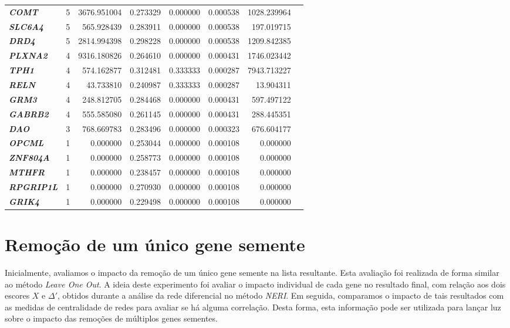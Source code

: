 \begin{table}[]
\begin{tabular}{@{}lrrrrrrr@{}}
\textbf{\textsl{COMT}}  &   5 &    3676.951004 & 0.273329 & 0.000000 & 0.000538 & 1028.239964 \\
\textbf{\textsl{SLC6A4}}  &   5 &     565.928439 & 0.283911 & 0.000000 & 0.000538 &  197.019715 \\
\textbf{\textsl{DRD4}}  &   5 &    2814.994398 & 0.298228 & 0.000000 & 0.000538 & 1209.842385 \\
\textbf{\textsl{PLXNA2}}  &   4 &    9316.180826 & 0.264610 & 0.000000 & 0.000431 & 1746.023442 \\
\textbf{\textsl{TPH1}}  &   4 &     574.162877 & 0.312481 & 0.333333 & 0.000287 & 7943.713227 \\
\textbf{\textsl{RELN}}  &   4 &      43.733810 & 0.240987 & 0.333333 & 0.000287 &   13.904311 \\
\textbf{\textsl{GRM3}}  &   4 &     248.812705 & 0.284468 & 0.000000 & 0.000431 &  597.497122 \\
\textbf{\textsl{GABRB2}}  &   4 &     555.585080 & 0.261145 & 0.000000 & 0.000431 &  288.445351 \\
\textbf{\textsl{DAO}}  &   3 &     768.669783 & 0.283496 & 0.000000 & 0.000323 &  676.604177 \\
\textbf{\textsl{OPCML}}  &   1 &       0.000000 & 0.253044 & 0.000000 & 0.000108 &    0.000000 \\
\textbf{\textsl{ZNF804A}}  &   1 &       0.000000 & 0.258773 & 0.000000 & 0.000108 &    0.000000 \\
\textbf{\textsl{MTHFR}}  &   1 &       0.000000 & 0.238457 & 0.000000 & 0.000108 &    0.000000 \\
\textbf{\textsl{RPGRIP1L}}  &   1 &       0.000000 & 0.270930 & 0.000000 & 0.000108 &    0.000000 \\
\textbf{\textsl{GRIK4}}  &   1 &       0.000000 & 0.229498 & 0.000000 & 0.000108 &    0.000000 \\ \bottomrule

\end{tabular}
\end{table}




\section{Remoção de um único gene semente}
%
Inicialmente, avaliamos o impacto da remoção de um único gene semente na lista resultante.
Esta avaliação foi realizada de forma similar ao método \textit{Leave One Out}.
A ideia deste experimento foi avaliar o impacto individual de cada gene no resultado final, com relação aos dois escores $X$ e $\Delta'$, obtidos durante a análise da rede diferencial no método \textsl{NERI}.
Em seguida, comparamos o impacto de tais resultados com as medidas de centralidade de redes para avaliar se há alguma correlação.
Desta forma, esta informação pode ser utilizada para lançar luz sobre o impacto das remoções de múltiplos genes sementes.

